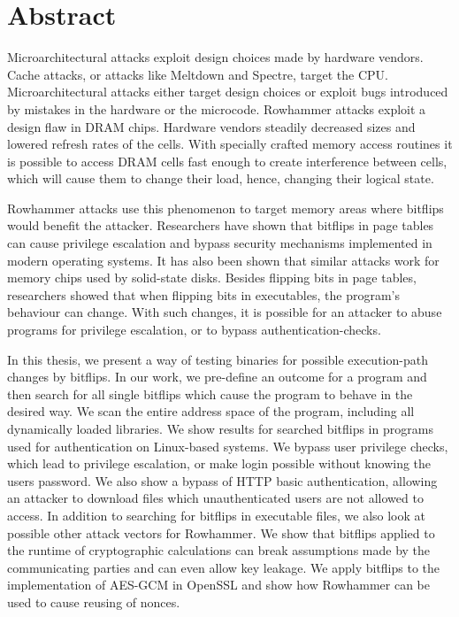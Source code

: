 
{}
\chapter*{Abstract}
\label{cha:abstract}

Microarchitectural attacks exploit design choices made by hardware vendors.
Cache attacks, or attacks like Meltdown and Spectre, target the CPU.
Microarchitectural attacks either target design choices or exploit bugs
introduced by mistakes in the hardware or the microcode. Rowhammer attacks
exploit a design flaw in DRAM chips. Hardware vendors steadily decreased sizes
and lowered refresh rates of the cells. With specially crafted memory access
routines it is possible to access DRAM cells fast enough to create interference
between cells, which will cause them to change their load, hence, changing their
logical state.

Rowhammer attacks use this phenomenon to target memory areas where bitflips
would benefit the attacker. Researchers have shown that bitflips in page tables
can cause privilege escalation and bypass security mechanisms implemented in
modern operating systems. It has also been shown that similar attacks work for
memory chips used by solid-state disks. Besides flipping bits in page tables,
researchers showed that when flipping bits in executables, the program's
behaviour can change. With such changes, it is possible for an attacker to abuse
programs for privilege escalation, or to bypass authentication-checks.

In this thesis, we present a way of testing binaries for possible execution-path
changes by bitflips. In our work, we pre-define an outcome for a program and
then search for all single bitflips which cause the program to behave in the
desired way. We scan the entire address space of the program, including all
dynamically loaded libraries. We show results for searched bitflips in programs
used for authentication on Linux-based systems. We bypass user privilege checks,
which lead to privilege escalation, or make login possible without knowing the
user\textquotesingle s password. We also show a bypass of HTTP basic
authentication, allowing an attacker to download files which unauthenticated
users are not allowed to access. In addition to searching for bitflips in
executable files, we also look at possible other attack vectors for Rowhammer.
We show that bitflips applied to the runtime of cryptographic calculations can
break assumptions made by the communicating parties and can even allow key
leakage. We apply bitflips to the implementation of AES-GCM in OpenSSL and show
how Rowhammer can be used to cause reusing of nonces.

